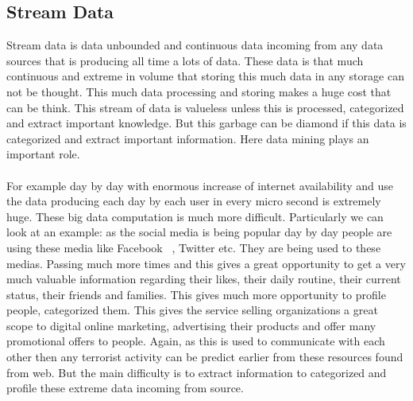\subsection{Stream Data}
Stream data is data unbounded and continuous data incoming from any data sources that is producing all time a lots of data. These data is that much continuous and extreme in volume that storing this much data in any storage can not be thought. This much data processing and storing makes a huge cost that can be think. This stream of data is valueless unless this is processed, categorized and extract important knowledge. But this garbage can be diamond if this data is categorized and extract important information. Here data mining plays an important role.\\ \\
 For example day by day with enormous increase of internet availability and use the data producing each day by each user in every micro second is extremely huge. These big data computation is much more difficult. Particularly we can look at an example: as the social media is being popular day by day people are using these media like Facebook ~\cite{facebook}, Twitter \cite{twitter} etc. They are being used to these medias. Passing much more times and this gives a great opportunity to get a very much valuable information regarding their likes, their daily routine, their current status, their friends and families. This gives much more opportunity to profile people, categorized them. This gives the service selling organizations a great scope to digital online marketing, advertising their products and offer many promotional offers to people. Again, as this is used to communicate with each other then any terrorist activity can be predict earlier from these resources found from web. But the main difficulty is to extract information to categorized and profile these extreme data incoming from source.

